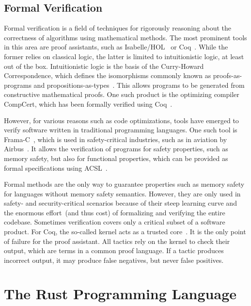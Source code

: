 \subsection{Formal Verification}
\label{sec:verification}

Formal verification is a field of techniques for rigorously reasoning about the correctness of algorithms using mathematical methods. The most prominent tools in this area are proof assistants, such as Isabelle/HOL~\cite{isabelle} or Coq~\cite{coq}. While the former relies on classical logic, the latter is limited to intuitionistic logic, at least out of the box. Intuitionistic logic is the basis of the Curry-Howard Correspondence, which defines the isomorphisms commonly known as proofs-as-programs and propositions-as-types~\cite{sorensen2006lectures}. This allows programs to be generated from constructive mathematical proofs. One such product is the optimizing  compiler CompCert, which has been formally verified using Coq~\cite{compcert}.

However, for various reasons such as code optimizations, tools have emerged to verify software written in traditional programming languages. One such tool is Frama-C~\cite{frama-c}, which is used in safety-critical industries, such as in aviation by Airbus~\cite{cuoq:hal-02263407}. It allows the verification of  programs for safety properties, such as memory safety, but also for functional properties, which can be provided as formal specifications using \gls{ACSL}~\cite{acsl}.

Formal methods are the only way to guarantee properties such as memory safety for languages without memory safety semantics. However, they are only used in safety- and security-critical scenarios because of their steep learning curve and the enormous effort~(and thus cost) of formalizing and verifying the entire codebase. Sometimes verification covers only a critical subset of a software product. For Coq, the so-called kernel acts as a trusted core~\cite{coq}. It is the only point of failure for the proof assistant. All tactics rely on the kernel to check their output, which are terms in a common proof language. If a tactic produces incorrect output, it may produce false negatives, but never false positives.

\section{The Rust Programming Language}
\label{sec:rust}

